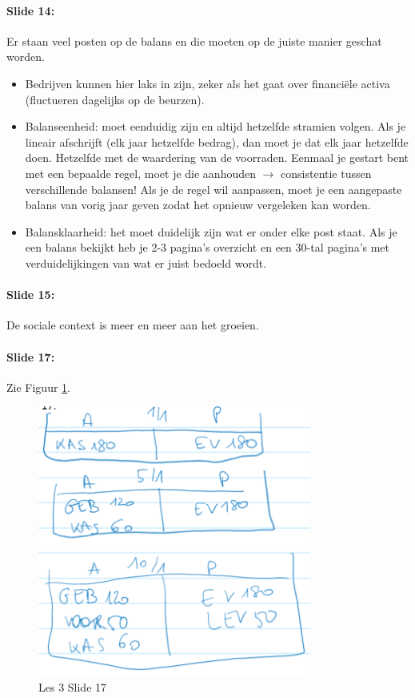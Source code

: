 \documentclass[10pt,a4paper]{report}
\begin{document}
\paragraph{Slide 14:} Er staan veel posten op de balans en die moeten op de juiste manier geschat worden.
\begin{itemize} 
\item Bedrijven kunnen hier laks in zijn, zeker als het gaat over financi\"ele activa (fluctueren dagelijks op de beurzen). 
\item Balanseenheid: moet eenduidig zijn en altijd hetzelfde stramien volgen. Als je lineair afschrijft (elk jaar hetzelfde bedrag), dan moet je dat elk jaar hetzelfde doen. Hetzelfde met de waardering van de voorraden. Eenmaal je gestart bent met een bepaalde regel, moet je die aanhouden $\rightarrow$ consistentie tussen verschillende balansen! Als je de regel wil aanpassen, moet je een aangepaste balans van vorig jaar geven zodat het opnieuw vergeleken kan worden.
\item Balansklaarheid: het moet duidelijk zijn wat er onder elke post staat. Als je een balans bekijkt heb je 2-3 pagina's overzicht en een 30-tal pagina's met verduidelijkingen van wat er juist bedoeld wordt.
\end{itemize}

\paragraph{Slide 15:} De sociale context is meer en meer aan het groeien.

\paragraph{Slide 17:} Zie Figuur \ref{les03_03}.

\begin{figure}[h!]
\centering
\includegraphics[width=90mm]{Les03_03.png}
\caption{Les 3 Slide 17} 
\label{les03_03}
\end{figure}
\end{document}
